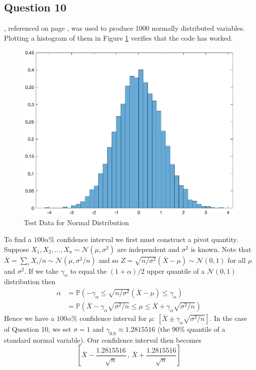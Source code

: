 \documentclass[10pt,a4paper,notitlepage]{article}
\newcommand{\Nd}{\mathcal{N}}
\begin{document}
\subsection*{\centering Question 10}
, referenced on page \pageref{cd:10.1}, was used to produce 1000 normally distributed variables. Plotting a histogram of them in Figure \ref{NormTest} verifies that the code has worked.
\begin{figure}[H]
\centering
\includegraphics[width=12cm]{Image_8_25}
\caption{Test Data for Normal Distribution}\label{NormTest}
\end{figure}

To find a $100\alpha\%$ confidence interval we first must construct a pivot quantity. Suppose $X_{1},X_{2},\hdots,X_{n}\sim \Nd\left(\mu,\sigma^{2}\right)$ are independent and $\sigma^{2}$ is known. Note that $\overline{X}=\sum_{i}X_{i}/n\sim \Nd\left(\mu,\sigma^{2}/n\right)$ and so $Z=\sqrt{n/\sigma^{2}}\left(\overline{X}-\mu\right)\sim \Nd\left(0,1\right)$ for all $\mu$ and $\sigma^{2}$. If we take $\gamma_{\alpha}$ to equal the $(1+\alpha)/2$ upper quantile of a $\Nd\left(0,1\right)$ distribution then
\begin{equation}
\begin{aligned}
\alpha &= \mathbb{P}\left(-\gamma_{\alpha}\leq \sqrt{n/\sigma^{2}}\left(\overline{X}-\mu\right)\leq \gamma_{\alpha} \right)\\
&= \mathbb{P}\left(\overline{X}-\gamma_{\alpha}\sqrt{\sigma^{2}/n}\leq\mu\leq\overline{X}+\gamma_{\alpha}\sqrt{\sigma^{2}/n}\right)
\end{aligned}
\end{equation}
Hence we have a $100\alpha\%$ confidence interval for $\mu$: $\left[\overline{X}\pm\gamma_{\alpha}\sqrt{\sigma^{2}/n}\right]$. In the case of Question 10, we set $\sigma=1$ and $\gamma_{0.8}\approx1.2815516$ (the $90\%$ quantile of a standard normal variable). Our confidence interval then becomes 
\begin{equation}
\left[\overline{X}-\frac{1.2815516}{\sqrt{n}} \, , \, \overline{X}+\frac{1.2815516}{\sqrt{n}}\right]
\end{equation}
\end{document}
